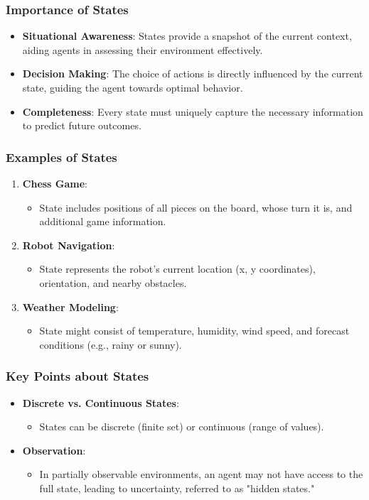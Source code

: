 \documentclass{beamer}
\begin{document}
\begin{frame}[fragile]
    \frametitle{Importance of States}
    \begin{itemize}
        \item \textbf{Situational Awareness}: States provide a snapshot of the current context, aiding agents in assessing their environment effectively.
        \item \textbf{Decision Making}: The choice of actions is directly influenced by the current state, guiding the agent towards optimal behavior.
        \item \textbf{Completeness}: Every state must uniquely capture the necessary information to predict future outcomes.
    \end{itemize}
\end{frame}

\begin{frame}[fragile]
    \frametitle{Examples of States}
    \begin{enumerate}
        \item \textbf{Chess Game}: 
        \begin{itemize}
            \item State includes positions of all pieces on the board, whose turn it is, and additional game information.
        \end{itemize}
        \item \textbf{Robot Navigation}: 
        \begin{itemize}
            \item State represents the robot's current location (x, y coordinates), orientation, and nearby obstacles.
        \end{itemize}
        \item \textbf{Weather Modeling}: 
        \begin{itemize}
            \item State might consist of temperature, humidity, wind speed, and forecast conditions (e.g., rainy or sunny).
        \end{itemize}
    \end{enumerate}
\end{frame}

\begin{frame}[fragile]
    \frametitle{Key Points about States}
    \begin{itemize}
        \item \textbf{Discrete vs. Continuous States}: 
        \begin{itemize}
            \item States can be discrete (finite set) or continuous (range of values).
        \end{itemize}
        \item \textbf{Observation}: 
        \begin{itemize}
            \item In partially observable environments, an agent may not have access to the full state, leading to uncertainty, referred to as "hidden states."
        \end{itemize}
    \end{itemize}
\end{frame}
\end{document}
